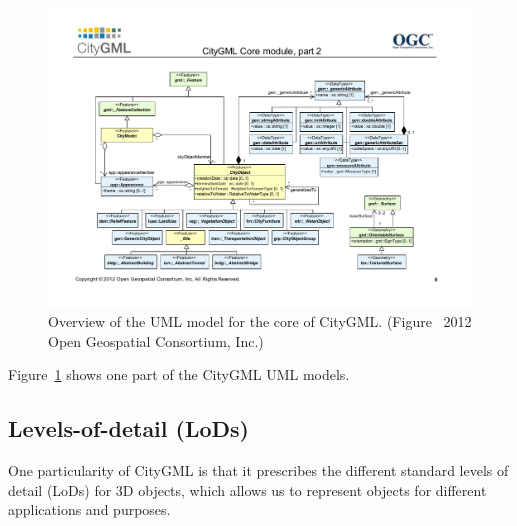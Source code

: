 \begin{figure}
  \centering
  \includegraphics[width=0.95\linewidth]{figs/citygml_uml_core}
  \caption{Overview of the UML model for the core of CityGML\@. (Figure \textcopyright\ 2012 Open Geospatial Consortium, Inc.)}
\label{fig:citygml_uml_core}
\end{figure}
Figure~\ref{fig:citygml_uml_core} shows one part of the CityGML UML models.

%

\subsection{Levels-of-detail (LoDs)} 

One particularity of CityGML is that it prescribes the different standard levels of detail (LoDs) for 3D objects, which allows us to represent objects for different applications and purposes.

